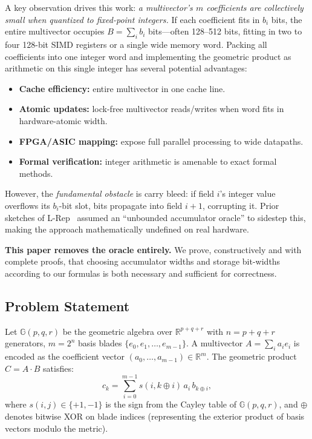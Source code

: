 \documentclass[11pt,a4paper]{article}
\theoremstyle{definition}
\theoremstyle{plain}
\theoremstyle{remark}
\newcommand{\GA}{\mathbb{G}}
\begin{document}
A key observation drives this work: \emph{a multivector's $m$ coefficients are collectively small when quantized to fixed-point integers.}  If each coefficient fits in $b_i$ bits, the entire multivector occupies $B = \sum_i b_i$ bits---often 128--512 bits, fitting in two to four 128-bit SIMD registers or a single wide memory word.  Packing all coefficients into one integer word and implementing the geometric product as arithmetic on this single integer has several potential advantages:
\begin{itemize}
  \item \textbf{Cache efficiency:} entire multivector in one cache line.
  \item \textbf{Atomic updates:} lock-free multivector reads/writes when word fits in hardware-atomic width.
  \item \textbf{FPGA/ASIC mapping:} expose full parallel processing to wide datapaths.
  \item \textbf{Formal verification:} integer arithmetic is amenable to exact formal methods.
\end{itemize}

However, the \emph{fundamental obstacle} is carry bleed: if field $i$'s integer value overflows its $b_i$-bit slot, bits propagate into field $i+1$, corrupting it. Prior sketches of L-Rep~\cite{dang2025sketch} assumed an ``unbounded accumulator oracle'' to sidestep this, making the approach mathematically undefined on real hardware.

\textbf{This paper removes the oracle entirely.}  We prove, constructively and with complete proofs, that choosing accumulator widths and storage bit-widths according to our formulas is both necessary and sufficient for correctness.

\subsection{Problem Statement}

Let $\GA(p,q,r)$ be the geometric algebra over $\mathbb{R}^{p+q+r}$ with $n=p+q+r$ generators, $m=2^n$ basis blades $\{e_0, e_1,\ldots,e_{m-1}\}$.  A multivector $A = \sum_i a_i e_i$ is encoded as the coefficient vector $(a_0,\ldots,a_{m-1}) \in \mathbb{R}^m$.  The geometric product $C = A \cdot B$ satisfies:
\begin{equation}\label{eq:gaprod}
  c_k = \sum_{i=0}^{m-1} s(i, k\oplus i)\, a_i\, b_{k\oplus i},
\end{equation}
where $s(i,j)\in\{+1,-1\}$ is the sign from the Cayley table of $\GA(p,q,r)$, and $\oplus$ denotes bitwise XOR on blade indices (representing the exterior product of basis vectors modulo the metric).
\end{document}
